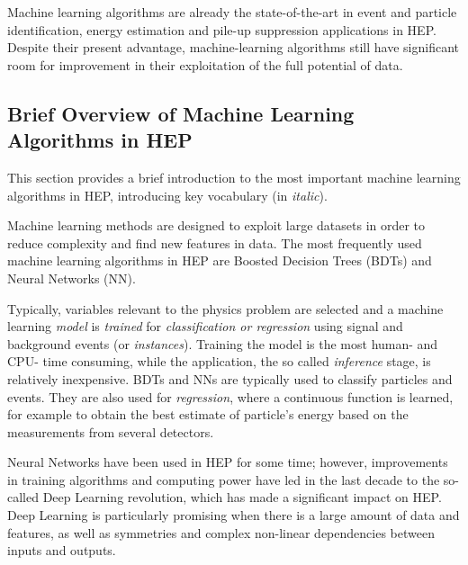 Machine learning algorithms are already the state-of-the-art in event and particle identification, energy estimation and pile-up suppression applications in HEP. Despite their present advantage, machine-learning algorithms still have significant room for improvement in their exploitation of the full potential of data.


\subsection{Brief Overview of Machine Learning Algorithms in HEP}

This section provides a brief introduction to the most important machine learning algorithms in HEP, introducing key vocabulary (in {\it italic}).


Machine learning methods are designed to exploit large datasets in order to reduce complexity and find new features in data. The most frequently used machine learning algorithms in HEP are Boosted Decision Trees (BDTs) and Neural Networks (NN).

Typically, variables relevant to the physics problem are selected and a machine learning {\it model} is {\it trained} for {\it classification or regression} using signal and background events (or {\it instances}). Training the model is the most human- and CPU- time consuming, while the application, the so called {\it inference} stage, is relatively inexpensive. BDTs and NNs are typically used to classify particles and events. They are also used for {\it regression}, where a continuous function is learned, for example to obtain the best estimate of particle's energy based on the measurements from several detectors.

Neural Networks have been used in HEP for some time; however, improvements in training algorithms and computing power have led in the last decade to the so-called Deep Learning
revolution, which has made a significant impact on HEP. Deep Learning is particularly promising when there is a large amount of data and features, as well as symmetries and complex non-linear dependencies between inputs and outputs.


